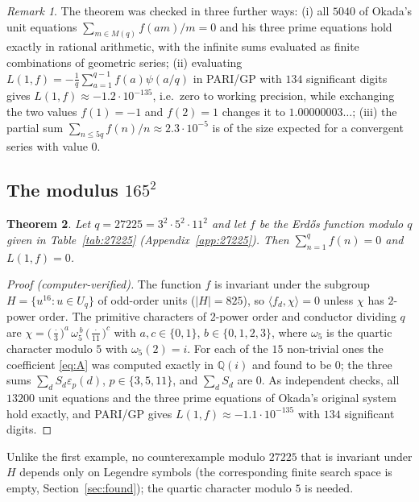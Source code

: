 \documentclass[11pt]{amsart}
\newtheorem{theorem}{Theorem}[section]
\theoremstyle{definition}
\theoremstyle{remark}
\newtheorem{remark}[theorem]{Remark}
\providecommand{\Q}{\mathbb Q}
\newcommand{\ip}[2]{\langle #1,#2\rangle}
\numberwithin{equation}{section}
\begin{document}
\begin{remark}\label{rem:11025checks}
The theorem was checked in three further ways:
(i) all $5040$ of Okada's unit equations $\sum_{m\in M(q)}f(am)/m=0$ and his three prime equations hold exactly in rational arithmetic, with the infinite sums evaluated as finite combinations of geometric series;
(ii) evaluating $L(1,f)=-\frac1q\sum_{a=1}^{q-1}f(a)\psi(a/q)$ in PARI/GP \cite{PARI} with $134$ significant digits gives $L(1,f)\approx-1.2\cdot10^{-135}$, i.e.\ zero to working precision, while exchanging the two values $f(1)=-1$ and $f(2)=1$ changes it to $1.00000003\ldots$;
(iii) the partial sum $\sum_{n\le 5q}f(n)/n\approx2.3\cdot10^{-5}$ is of the size expected for a convergent series with value $0$.
\end{remark}

\subsection{\texorpdfstring{The modulus $165^2$}{The modulus 165^2}}
\begin{theorem}\label{thm:27225}
Let $q=27225=3^2\cdot 5^2\cdot 11^2$ and let $f$ be the Erd\H{o}s function modulo $q$ given in Table~\ref{tab:27225} (Appendix~\ref{app:27225}).
Then $\sum_{n=1}^{q}f(n)=0$ and $L(1,f)=0$.
\end{theorem}

\begin{proof}[Proof (computer-verified)]
The function $f$ is invariant under the subgroup $H=\{u^{16}:u\in U_q\}$ of odd-order units ($|H|=825$), so $\ip{f_d}{\chi}=0$ unless $\chi$ has $2$-power order.
The primitive characters of $2$-power order and conductor dividing $q$ are $\chi=\bigl(\frac{\cdot}{3}\bigr)^{a}\,\omega_5^{\,b}\,\bigl(\frac{\cdot}{11}\bigr)^{c}$ with $a,c\in\{0,1\}$, $b\in\{0,1,2,3\}$, where $\omega_5$ is the quartic character modulo $5$ with $\omega_5(2)=i$.
For each of the $15$ non-trivial ones the coefficient \eqref{eq:A} was computed exactly in $\Q(i)$ and found to be $0$; the three sums $\sum_dS_d\varepsilon_p(d)$, $p\in\{3,5,11\}$, and $\sum_dS_d$ are $0$.
As independent checks, all $13200$ unit equations and the three prime equations of Okada's original system hold exactly, and PARI/GP gives $L(1,f)\approx-1.1\cdot10^{-135}$ with $134$ significant digits.
\end{proof}

Unlike the first example, no counterexample modulo $27225$ that is invariant under $H$ depends only on Legendre symbols (the corresponding finite search space is empty, Section~\ref{sec:found}); the quartic character modulo $5$ is needed.
\end{document}
